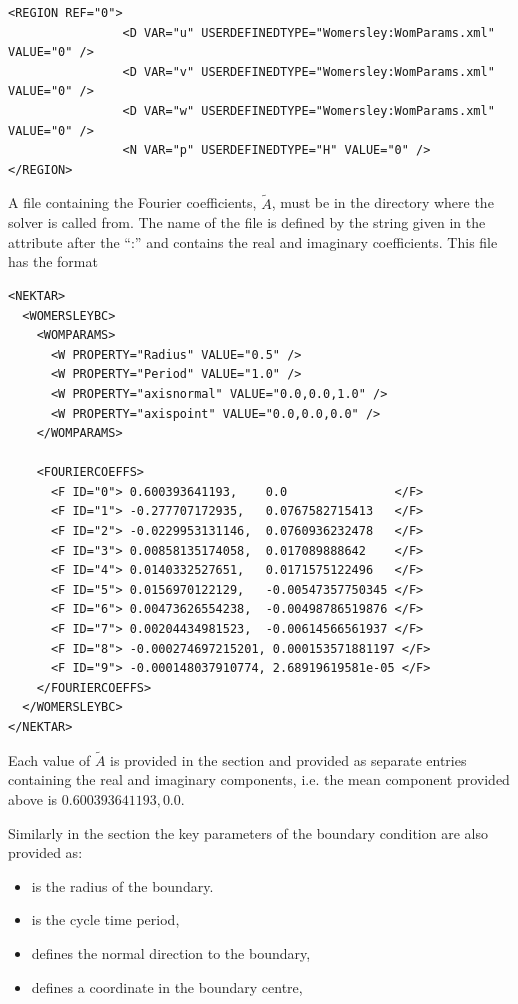 \begin{lstlisting}[style=XMLStyle]
<REGION REF="0">
                <D VAR="u" USERDEFINEDTYPE="Womersley:WomParams.xml" VALUE="0" />
                <D VAR="v" USERDEFINEDTYPE="Womersley:WomParams.xml" VALUE="0" />
                <D VAR="w" USERDEFINEDTYPE="Womersley:WomParams.xml" VALUE="0" />
                <N VAR="p" USERDEFINEDTYPE="H" VALUE="0" />
</REGION>
\end{lstlisting}

A file containing the Fourier coefficients, $\tilde{A}$, must be in
the directory where the solver is called from. The name of the file is
defined by the string given in the attribute 
after the ``:'' and contains the real and imaginary coefficients. This
file has the format
\begin{lstlisting}[style=XMLStyle]
<NEKTAR>
  <WOMERSLEYBC>
    <WOMPARAMS>
      <W PROPERTY="Radius" VALUE="0.5" />
      <W PROPERTY="Period" VALUE="1.0" />
      <W PROPERTY="axisnormal" VALUE="0.0,0.0,1.0" />
      <W PROPERTY="axispoint" VALUE="0.0,0.0,0.0" />
    </WOMPARAMS>

    <FOURIERCOEFFS>
      <F ID="0"> 0.600393641193,    0.0               </F>
      <F ID="1"> -0.277707172935,   0.0767582715413   </F>
      <F ID="2"> -0.0229953131146,  0.0760936232478   </F>
      <F ID="3"> 0.00858135174058,  0.017089888642    </F>
      <F ID="4"> 0.0140332527651,   0.0171575122496   </F>
      <F ID="5"> 0.0156970122129,   -0.00547357750345 </F>
      <F ID="6"> 0.00473626554238,  -0.00498786519876 </F>
      <F ID="7"> 0.00204434981523,  -0.00614566561937 </F>
      <F ID="8"> -0.000274697215201, 0.000153571881197 </F>
      <F ID="9"> -0.000148037910774, 2.68919619581e-05 </F>
    </FOURIERCOEFFS>
  </WOMERSLEYBC>
</NEKTAR>
\end{lstlisting}

Each value of $\tilde{A}$ is provided in the 
section and provided as separate entries containing the real and
imaginary components, i.e. the mean component provided above is
$0.600393641193,0.0$.

Similarly in the  section the key parameters of the boundary condition are also provided as:
\begin{itemize}
\item {} is the radius of the boundary.
\item {} is the cycle time period,
\item {} defines the normal direction to the boundary,
\item {}  defines a coordinate in the boundary centre,
\end{itemize}


